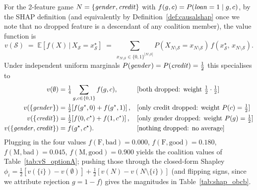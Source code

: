 For the 2-feature game $N=\{\varname{gender},\varname{credit}\}$ with
$f(g,c)=P(\varname{loan}=1\mid g,c)$, by the SHAP definition (and equivalently by
Definition~\ref{def:causalshap} once we note that no dropped feature is a
descendant of any coalition member), the value function is
\[
v(\mathcal{S}) \;=\; \mathbb{E}\!\left[f(X)\,\big|\,X_{\mathcal{S}} = x_{\mathcal{S}}^\star\right]
\;=\; \sum_{x_{N\setminus\mathcal{S}}\in\{0,1\}^{|N\setminus\mathcal{S}|}} P(X_{N\setminus\mathcal{S}}=x_{N\setminus\mathcal{S}})\,f(x_{\mathcal{S}}^\star,\,x_{N\setminus\mathcal{S}}).
\]
Under independent uniform marginals
$P(\varname{gender})=P(\varname{credit})=\tfrac{1}{2}$ this specialises to
\begin{align*}
v(\emptyset)                              &= \tfrac{1}{4}\sum_{g,c\in\{0,1\}} f(g,c),
&&[\text{both dropped: weight } \tfrac{1}{2}\cdot\tfrac{1}{2}] \\
v(\{\varname{gender}\})                   &= \tfrac{1}{2}\!\left[f(g^\star,0)+f(g^\star,1)\right],
&&[\text{only credit dropped: weight } P(c) = \tfrac{1}{2}] \\
v(\{\varname{credit}\})                   &= \tfrac{1}{2}\!\left[f(0,c^\star)+f(1,c^\star)\right],
&&[\text{only gender dropped: weight } P(g) = \tfrac{1}{2}] \\
v(\{\varname{gender},\varname{credit}\})  &= f(g^\star,c^\star).
&&[\text{nothing dropped: no average}]
\end{align*}
Plugging in the four values
$f(\text{F},\text{bad})=0.000$, $f(\text{F},\text{good})=0.180$,
$f(\text{M},\text{bad})=0.045$, $f(\text{M},\text{good})=0.900$ yields the
coalition values of Table~\ref{tab:vS_optionA}; pushing those through the
closed-form Shapley
$\phi_i = \tfrac{1}{2}[v(\{i\})-v(\emptyset)] + \tfrac{1}{2}[v(N)-v(N\!\setminus\!\{i\})]$
(and flipping signs, since we attribute rejection $g=1-f$) gives the magnitudes
in Table~\ref{tab:shap_obcb}.
